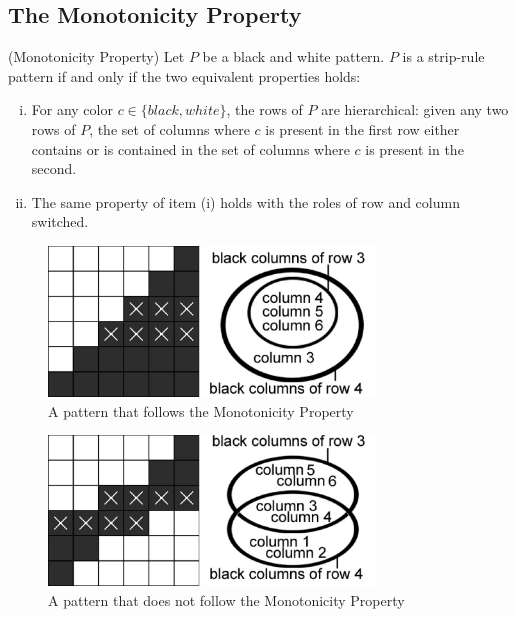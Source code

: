 
\subsection{The Monotonicity Property}
\label{ss_monoton}

\begin{theorem} 
\label{theorem_strip_rule_patterns}
(Monotonicity Property) Let $P$ be a black and white pattern. $P$ is a strip-rule pattern if and only if the two equivalent properties holds:

\begin{enumerate}[(i)]
\item For any color $c \in \{black, white\}$, the rows of $P$ are hierarchical: given any two rows of $P$, the set of columns where $c$ is present in the first row either contains or is contained in the set of columns where $c$ is present in the second.

\item The same property of item (i) holds with the roles of row and column switched.
\end{enumerate}

\begin{figure}[h]
\centering
\includegraphics[height=4cm]{monotonicity_example_good}
\caption{A pattern that follows the Monotonicity Property}
\end{figure}

\begin{figure}[h]
\centering
\includegraphics[height=4cm]{monotonicity_example_bad}
\caption{A pattern that does not follow the Monotonicity Property}
\end{figure}

\end{theorem}


